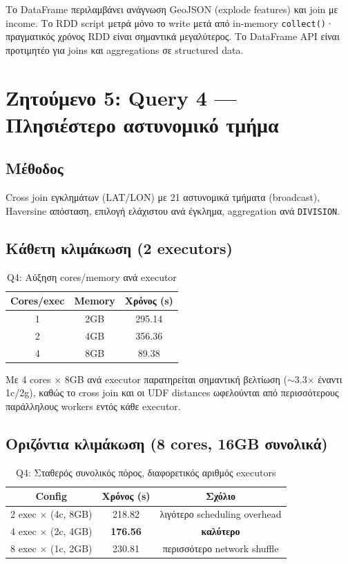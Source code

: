 \documentclass[11pt,a4paper]{article}
\begin{document}
Το DataFrame περιλαμβάνει ανάγνωση GeoJSON (explode features) και join με income.
Το RDD script μετρά μόνο το write μετά από in-memory \texttt{collect()}·
πραγματικός χρόνος RDD είναι σημαντικά μεγαλύτερος. Το DataFrame API είναι
προτιμητέο για joins και aggregations σε structured data.

\section{Ζητούμενο 5: Query 4 --- Πλησιέστερο αστυνομικό τμήμα}

\subsection{Μέθοδος}

Cross join εγκλημάτων (LAT/LON) με 21 αστυνομικά τμήματα (broadcast),
Haversine απόσταση, επιλογή ελάχιστου ανά έγκλημα, aggregation ανά \texttt{DIVISION}.

\subsection{Κάθετη κλιμάκωση (2 executors)}

\begin{table}[h]
\centering
\caption{Q4: Αύξηση cores/memory ανά executor}
\begin{tabular}{ccc}
\toprule
Cores/exec & Memory & Χρόνος (s) \\
\midrule
1 & 2GB & 295.14 \\
2 & 4GB & 356.36 \\
4 & 8GB & 89.38 \\
\bottomrule
\end{tabular}
\end{table}

Με 4 cores $\times$ 8GB ανά executor παρατηρείται σημαντική βελτίωση ($\sim$3.3$\times$
έναντι 1c/2g), καθώς το cross join και οι UDF distances ωφελούνται από
περισσότερους παράλληλους workers εντός κάθε executor.

\subsection{Οριζόντια κλιμάκωση (8 cores, 16GB συνολικά)}

\begin{table}[h]
\centering
\caption{Q4: Σταθερός συνολικός πόρος, διαφορετικός αριθμός executors}
\begin{tabular}{ccc}
\toprule
Config & Χρόνος (s) & Σχόλιο \\
\midrule
2 exec $\times$ (4c, 8GB) & 218.82 & λιγότερο scheduling overhead \\
4 exec $\times$ (2c, 4GB) & \textbf{176.56} & \textbf{καλύτερο} \\
8 exec $\times$ (1c, 2GB) & 230.81 & περισσότερο network shuffle \\
\bottomrule
\end{tabular}
\end{table}
\end{document}
